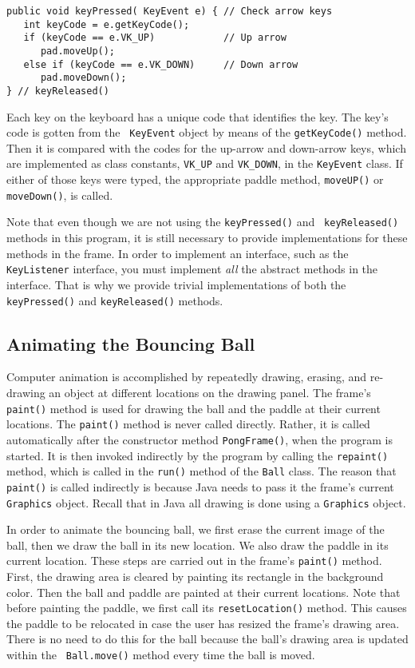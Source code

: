 \begin{jjjlisting}
\begin{lstlisting}
public void keyPressed( KeyEvent e) { // Check arrow keys
   int keyCode = e.getKeyCode();
   if (keyCode == e.VK_UP)            // Up arrow
      pad.moveUp();
   else if (keyCode == e.VK_DOWN)     // Down arrow
      pad.moveDown();
} // keyReleased()
\end{lstlisting}
\end{jjjlisting}

\noindent Each key on the keyboard has a unique code that 
identifies the key. The key's code is gotten from the {\tt
KeyEvent} object by means of the {\tt getKeyCode()} method. Then it is
compared with the codes for the up-arrow and down-arrow keys, which
are implemented as class constants, {\tt VK\_UP} and {\tt VK\_DOWN},
in the {\tt KeyEvent} class.  If either of those keys were typed, the
appropriate paddle method, {\tt moveUP()} or {\tt moveDown()}, is
called.  

Note that even though we are not using the {\tt keyPressed()} and {\tt
keyReleased()} methods in this program, it is still necessary to
provide implementations for these methods in the frame.  In order to
implement an interface, such as the {\tt KeyListener} interface, you
must implement {\em all} the abstract methods in the interface.  That
is why we provide trivial implementations of both the {\tt
keyPressed()} and {\tt keyReleased()} methods.

\subsection{Animating the Bouncing Ball}

Computer animation is accomplished by repeatedly drawing, erasing, and
re-drawing an object at different locations on the drawing panel.  The
frame's {\tt paint()} method is used for drawing the ball and the
paddle at their current locations.  The {\tt paint()} method is never
called directly. Rather, it is called automatically after the
constructor 
method {\tt PongFrame()}, when the program is started. It is then invoked indirectly by
the program by calling the {\tt repaint()} method, which is called in
the {\tt run()} method of the {\tt Ball} class.  The reason that {\tt
paint()} is called indirectly is because Java needs to pass it the
frame's current {\tt Graphics} object. Recall that in Java all
drawing is done using a {\tt Graphics} object.

In order to animate the bouncing ball, we first erase the current
image of the ball, then we draw the ball in its new location. We also
draw the paddle in its current location. These steps are carried out
in the frame's {\tt paint()} method. First, the drawing area is
cleared by painting its rectangle in the background color.  Then the
ball and paddle are painted at their current locations. Note that
before painting the paddle, we first call its {\tt resetLocation()}
method. This causes the paddle to be relocated in case the user has
resized the frame's drawing area.  There is no need to do this for
the ball because the ball's drawing area is updated within the {\tt
Ball.move()} method every time the ball is moved.


